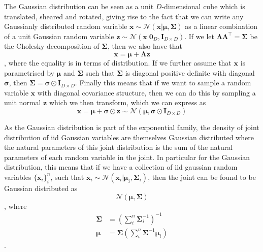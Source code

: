 The Gaussian distribution can be seen as a unit $D$-dimensional cube which is
translated, sheared and rotated, giving rise to the fact that we can write any
Gaussianly distributed random variable $\bm{x} \sim \mathcal{N}(\bm{x} |
\bm{\mu}, \bm{\Sigma})$ as a linear combination of a unit Gaussian random
variable $\bm{z} \sim \mathcal{N}(\bm{x} | \bm{0}_D, \bm{I}_{D \times D})$. If
we let $\bm{\Lambda} \bm{\Lambda}^{\top} = \bm{\Sigma}$ be the Cholesky
decomposition\cite[p.~100-102]{Press:2007:NRE:1403886} of $\bm{\Sigma}$, then we
also have that
\begin{equation}
  \label{eq:sample_x}
  \bm{x} = \bm{\mu} + \bm{\Lambda}\bm{z}
\end{equation},
where the equality is in terms of distribution. If we further assume that
$\bm{x}$ is parametrised by $\bm{\mu}$ and $\bm{\Sigma}$ such that $\bm{\Sigma}$
is diagonal positive definite with diagonal $\bm{\sigma}$, then $\bm{\Sigma} =
\bm{\sigma} \odot \bm{I}_{D \times D}$. Finally this means that if we want to
sample a random variable $\bm{x}$ with diagonal covariance structure, then we
can do this by sampling a unit normal $\bm{z}$ which we then transform, which we can express as
\begin{equation}
  \label{eq:sample_x_diag_covariance}
  \bm{x} = \bm{\mu} + \bm{\sigma} \odot \bm{z} \sim \mathcal{N}(\bm{\mu}, \bm{\sigma} \odot \bm{I}_{D \times D})
\end{equation}

As the Gaussian distribution is part of the exponential family, the density of
joint distribution of iid Gaussian variables are themselves Gaussian distributed
where the natural parameters of this joint distribution is the sum of the
natural parameters of each random variable in the joint. In particular for the
Gaussian distribution, this means that if we have a collection of iid gaussian
random variables $\{\bm{x}_i\}_i^n$, such that $\bm{x}_i \sim
\mathcal{N}(\bm{x}_i | \bm{\mu}_i, \bm{\Sigma}_{i})$, then the joint
can be found to be Gaussian distributed as
\begin{equation*}
  \mathcal{N}(\bm{\mu}, \bm{\Sigma})
\end{equation*},
where
\begin{align}
  \bm{\Sigma} & = \left( \sum_i^n \bm{\Sigma}_i^{-1} \right)^{-1} \label{eq:joint_indep_normal_covariance}\\ 
  \bm{\mu} & = \bm{\Sigma}\left( \sum_i^n \bm{\Sigma}^{-1} \bm{\mu}_i \right) \label{eq:joint_indep_normal_mean}
\end{align}\cite[p.~78-84]{Bishop:2006}.

